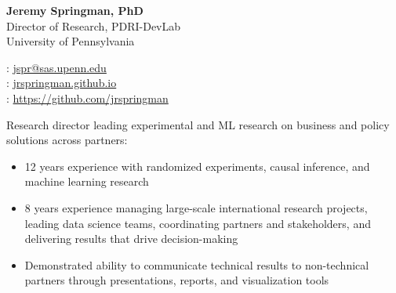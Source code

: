 \documentclass[11pt]{article}
\renewcommand{\today}{\monthname[\the\month] \the\year}
\begin{document}
\thispagestyle{empty}



\begin{multicols}{2}
{\Large {\bf Jeremy Springman, PhD}}\\
Director of Research, PDRI-DevLab\\
University of Pennsylvania\\

\columnbreak
\begin{flushright}

\faEnvelope: \href{mailto:jspr@sas.upenn.edu}{jspr@sas.upenn.edu}\\
\faLaptop: \url{jrspringman.github.io}\\
\faGithub: \url{https://github.com/jrspringman}\\
\end{flushright}
\end{multicols}
\vspace{-10pt}

Research director leading experimental and ML research on business and policy solutions across partners:
\begin{itemize}[itemsep=0mm, parsep=0pt]
\item 12 years experience with randomized experiments, causal inference, and machine learning research
\item 8 years experience managing large-scale international research projects, leading data science teams, coordinating partners and stakeholders, and delivering results that drive decision-making
\item Demonstrated ability to communicate technical results to non-technical partners through presentations, reports, and visualization tools


\end{itemize}
\end{document}
